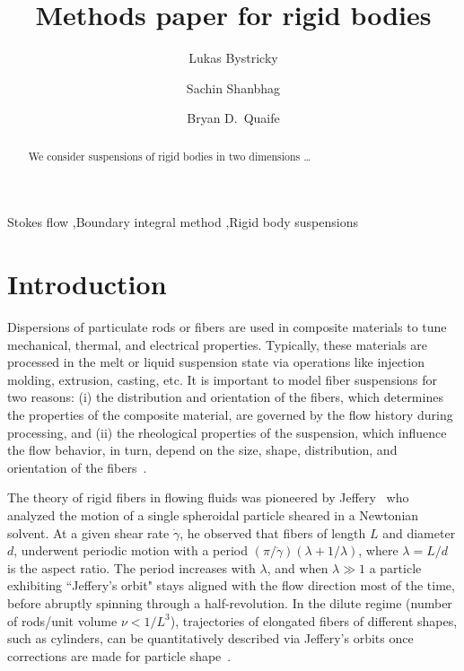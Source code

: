 \documentclass[preprint, 10pt]{elsarticle}
\begin{document}
\title{Methods paper for rigid bodies}

\author[Lukas]{Lukas Bystricky}
\author[Lukas]{Sachin Shanbhag}
\author[Bryan]{Bryan D.~Quaife}
\address[Lukas]{Department of Scientific Computing, Florida State University,
Tallahassee, FL, 32306.}
\address[Bryan]{Department of Scientific Computing and Geophysical Fluid
Dynamics Institute, Florida State University, Tallahassee, FL, 32306.}

\begin{abstract} 
We consider suspensions of rigid bodies in two dimensions \ldots
\end{abstract}

\begin{keyword}
  Stokes flow \sep Boundary integral method \sep Rigid body suspensions 
\end{keyword}

\maketitle


\section{Introduction\label{s:intro}}
Dispersions of particulate rods or fibers are used in composite
materials to tune mechanical, thermal, and electrical properties.
Typically, these materials are processed in the melt or liquid
suspension state via operations like injection molding, extrusion,
casting, etc. It is important to model fiber suspensions for two
reasons: (i) the distribution and orientation of the fibers, which
determines the properties of the composite material, are governed by the
flow history during processing, and (ii) the rheological properties of
the suspension, which influence the flow behavior, in turn, depend on
the size, shape, distribution, and orientation of the
fibers~\cite{larsoncf}.

The theory of rigid fibers in flowing fluids was pioneered by
Jeffery~\cite{Jeffery1922} who analyzed the motion of a single
spheroidal particle sheared in a Newtonian solvent. At a given shear
rate $\dot{\gamma}$, he observed that fibers of length $L$ and diameter
$d$, underwent periodic motion with a period $(\pi/\dot{\gamma})
(\lambda + 1/\lambda)$, where $\lambda = L/d$ is the aspect ratio. The
period increases with $\lambda$, and when $\lambda \gg 1$ a particle
exhibiting ``Jeffery's orbit" stays aligned with the flow direction most
of the time, before abruptly spinning through a half-revolution. In the
dilute regime (number of rods/unit volume $\nu < 1/L^3$), trajectories
of elongated fibers of different shapes, such as cylinders, can be
quantitatively described via Jeffery's orbits once corrections are made
for particle shape~\cite{Bretherton1962}.
\end{document}
